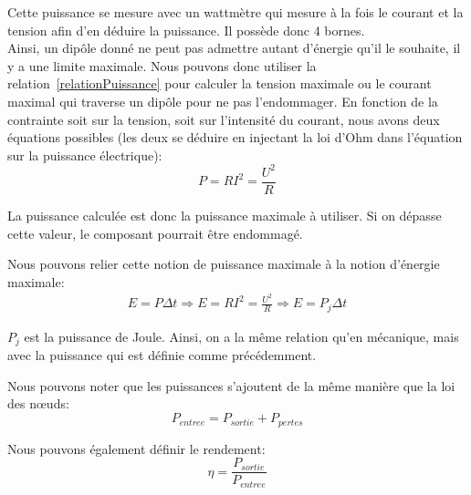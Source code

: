 \documentclass[12pt,a4paper,openany]{book}
\begin{document}
Cette puissance se mesure avec un wattmètre qui mesure à la fois le courant et la tension afin d'en déduire la puissance. Il possède donc 4 bornes.\\
Ainsi, un dipôle donné ne peut pas admettre autant d'énergie qu'il le souhaite, il y a une limite maximale. Nous pouvons donc utiliser la relation~\ref{relationPuissance} pour calculer la tension maximale ou le courant maximal qui traverse un dipôle pour ne pas l'endommager. En fonction de la contrainte soit sur la tension, soit sur l'intensité du courant, nous avons deux équations possibles (les deux se déduire en injectant la loi d'Ohm dans l'équation sur la puissance électrique):
\begin{equation}
P = RI^{2} = \frac{U^{2}}{R}
\end{equation}

La puissance calculée est donc la puissance maximale à utiliser. Si on dépasse cette valeur, le composant pourrait être endommagé.

\newpage

Nous pouvons relier cette notion de puissance maximale à la notion d'énergie maximale:
\begin{align}
E = P\Delta t \Rightarrow E = RI^{2} = \frac{U^{2}}{R} \Rightarrow E = P_{j}\Delta t
\end{align}

$ P_{j} $ est la puissance de Joule. Ainsi, on a la même relation qu'en mécanique, mais avec la puissance qui est définie comme précédemment.

\begin{figure}[!h]
\begin{center}
\end{center}
\end{figure}

Nous pouvons noter que les puissances s'ajoutent de la même manière que la loi des nœuds:
\begin{equation}
P_{entree} = P_{sortie} + P_{pertes}
\end{equation}

Nous pouvons également définir le rendement:
\begin{equation}
\eta = \frac{P_{sortie}}{P_{entree}}
\end{equation}
\end{document}
